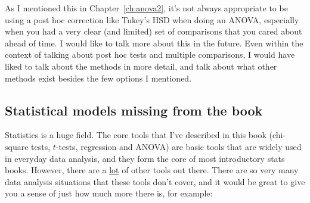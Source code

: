 \begin{itemize}
 As I mentioned this in Chapter~\ref{ch:anova2}, it's not always appropriate to be using a post hoc correction like Tukey's HSD when doing an ANOVA, especially when you had a very clear (and limited) set of comparisons that you cared about ahead of time. I would like to talk more about this in the future.
 Even within the context of talking about post hoc tests and multiple comparisons, I would have liked to talk about the methods in more detail, and talk about what other methods exist besides the few options I mentioned.
\end{itemize}

\subsection{Statistical models missing from the book}

Statistics is a huge field. The core tools that I've described in this book (chi-square tests, $t$-tests, regression and ANOVA) are basic tools that are widely used in everyday data analysis, and they form the core of most introductory stats books. However, there are a \underline{lot} of other tools out there. There are so very many data analysis situations that these tools don't cover, and it would be great to give you a sense of just how much more there is, for example: 


